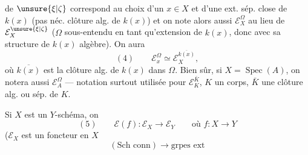 de $\unsure{\xi|\zeta}$ correspond au choix d'un $x\in X$ et d'une ext. sép. close  \inserted{$\Omega$} de $k(x)$ (pas néc.  clôture alg. de $k(x)$) et on note alors aussi $\mathcal E_X^\Omega$ au lieu de $\mathcal E_X^{\unsure{\xi|\zeta}}$ ($\Omega$ sous-entendu en tant qu'extension de $k(x)$, donc avec sa structure de $k(x)$ algèbre). On aura 
\[
(4)\qquad \mathcal E_x^\Omega\simeq\mathcal E_X^{\overline{k(x)}},
\]
où $\overline{k(x)}$ est la clôture  alg. de $k(x)$ dans $\Omega$. Bien sûr, si $X=\operatorname{Spec}(A)$, on notera aussi $\mathcal E_A^\Omega$ --- notation surtout utilisée pour $\mathcal E_K^{\bar K}$, $K$ un corps, $\bar K$ une clôture alg. ou sép. de $K$.

Si $X$ est un $Y$-schéma,  on 
\[
(5)\qquad \mathcal E(f):\mathcal E_X\longrightarrow\mathcal E_Y\qquad\text{où }f:X\longrightarrow Y
\]
($\mathcal E_X$ est un foncteur en $X$
\[
(\text{Sch conn})\longrightarrow\text{grpes ext}
\]
